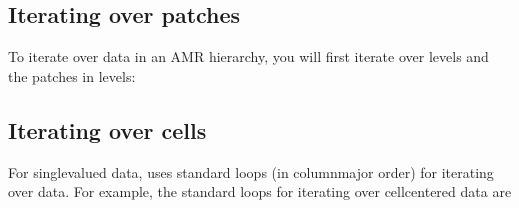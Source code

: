 \documentclass[letterpaper,10pt,english]{sphinxmanual}
\begin{document}
\subsection{Iterating over patches}
\label{\detokenize{Source/MeshData:iterating-over-patches}}
\sphinxAtStartPar
To iterate over data in an AMR hierarchy, you will first iterate over levels and the patches in levels:

\begin{sphinxVerbatim}[commandchars=\\\{\},formatcom=\scriptsize]
        
      \PYG{p}{[}\PYG{p}{]}

       

         
         \PYG{p}{[}\PYG{p}{]}
\end{sphinxVerbatim}


\subsection{Iterating over cells}
\label{\detokenize{Source/MeshData:iterating-over-cells}}
\sphinxAtStartPar
For single\sphinxhyphen{}valued data,  uses standard loops (in column\sphinxhyphen{}major order) for iterating over data.
For example, the standard loops for iterating over cell\sphinxhyphen{}centered data are
\end{document}

